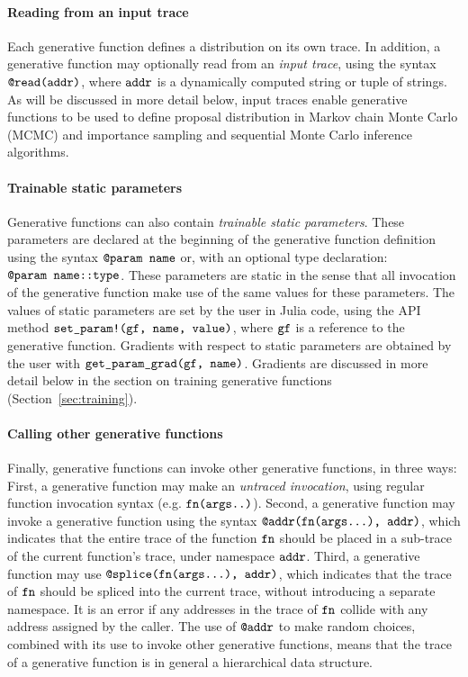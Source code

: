\paragraph{Reading from an input trace}
Each generative function defines a distribution on its own trace.
In addition, a generative function may optionally read from an \emph{input trace}, using the syntax $\mbox{\texttt{@read(addr)}}$, where $\mbox{\texttt{addr}}$ is a dynamically computed string or tuple of strings.
As will be discussed in more detail below, input traces enable generative functions to be used to define proposal distribution in Markov chain Monte Carlo (MCMC) and importance sampling and sequential Monte Carlo inference algorithms.

\paragraph{Trainable static parameters}
Generative functions can also contain \emph{trainable static parameters}.
These parameters are declared at the beginning of the generative function definition using the syntax $\mbox{\texttt{@param name}}$ or, with an optional type declaration: $\mbox{\texttt{@param name::type}}$.
These parameters are static in the sense that all invocation of the generative function make use of the same values for these parameters.
The values of static parameters are set by the user in Julia code, using the API method $\mbox{\texttt{set\_param!(gf, name, value)}}$, where $\mbox{\texttt{gf}}$ is a reference to the generative function.
Gradients with respect to static parameters are obtained by the user with $\mbox{\texttt{get\_param\_grad(gf, name)}}$.
Gradients are discussed in more detail below in the section on training generative functions (Section~\ref{sec:training}).

\paragraph{Calling other generative functions}
Finally, generative functions can invoke other generative functions, in three ways:
First, a generative function may make an \emph{untraced invocation}, using regular function invocation syntax (e.g. $\mbox{\texttt{fn(args..)}}$).
Second, a generative function may invoke a generative function using the syntax $\mbox{\texttt{@addr(fn(args...), addr)}}$, which indicates that the entire trace of the function $\mbox{\texttt{fn}}$ should be placed in a sub-trace of the current function's trace, under namespace $\mbox{\texttt{addr}}$.
Third, a generative function may use $\mbox{\texttt{@splice(fn(args...), addr)}}$, which indicates that the trace of $\mbox{\texttt{fn}}$ should be spliced into the current trace, without introducing a separate namespace.
It is an error if any addresses in the trace of $\mbox{\texttt{fn}}$ collide with any address assigned by the caller.
The use of $\mbox{\texttt{@addr}}$ to make random choices, combined with its use to invoke other generative functions, means that the trace of a generative function is in general a hierarchical data structure.

